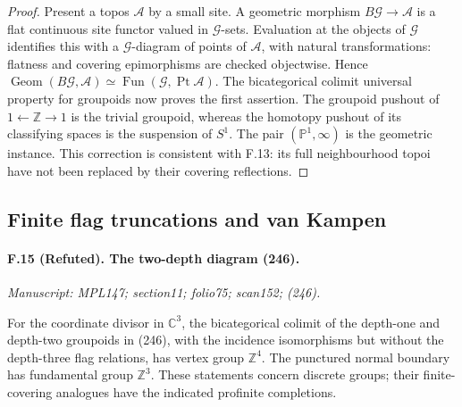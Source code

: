 \begin{proof}
Present a topos $\mathcal A$ by a small site. A geometric morphism
$B\mathcal G\to\mathcal A$ is a flat continuous site functor valued in
$\mathcal G$-sets. Evaluation at the objects of $\mathcal G$ identifies
this with a $\mathcal G$-diagram of points of $\mathcal A$, with natural
transformations: flatness and covering epimorphisms are checked
objectwise. Hence
$\operatorname{Geom}(B\mathcal G,\mathcal A)
\simeq\operatorname{Fun}(\mathcal G,\operatorname{Pt}\mathcal A)$.
The bicategorical colimit universal property for groupoids now proves
the first assertion. The groupoid pushout of $1\leftarrow\mathbb Z\to1$
is the trivial groupoid, whereas the homotopy pushout of its classifying
spaces is the suspension of $S^1$. The pair $(\mathbb P^1,\infty)$ is the
geometric instance. This correction is consistent with F.13: its full
neighbourhood topoi have not been replaced by their covering reflections.
\end{proof}

\subsection{Finite flag truncations and van Kampen}

\paragraph{F.15 (Refuted). The two-depth diagram (246).}
\textit{Manuscript: MPL147; section11; folio75; scan152; (246).}

For the coordinate divisor in $\mathbb C^3$, the bicategorical colimit
of the depth-one and depth-two groupoids in (246), with the incidence
isomorphisms but without the depth-three flag relations, has vertex
group $\mathbb Z^4$. The punctured normal boundary has fundamental
group $\mathbb Z^3$. These statements concern discrete groups; their
finite-covering analogues have the indicated profinite completions.

